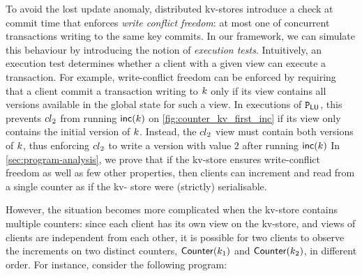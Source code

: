 To avoid the lost update anomaly, distributed kv-stores introduce a check at commit time that enforces 
\emph{write conflict freedom}: at most one of concurrent transactions writing to the same key commits. 
In our framework, we can simulate this behaviour by introducing the notion of \emph{execution tests}. 
Intuitively, an execution test determines whether a client with a given view can execute a transaction. 
For example, write-conflict freedom can be enforced by requiring that a client commit a transaction writing to $k$ 
only if its view contains all versions available in the global state for such a view. 
In executions of $\mathtt{P}_{\mathsf{LU}}$,
this prevents ${cl}_2$ from running $\mathsf{inc}(k)$ on \cref{fig:counter_kv_first_inc}
if its view only contains the initial version of $k$. 
Instead, the ${cl}_2$ view must contain both versions of $k$, 
thus enforcing ${cl}_2$ to write a version with value $2$ after running $\mathsf{inc}(k)$
In \cref{sec:program-analysis}, we prove that if the kv-store 
ensures write-conflict freedom as well as few other properties, then clients can increment 
and read from a single counter as if the kv- store were (strictly) serialisable.

However, the situation becomes more complicated when the kv-store contains multiple counters:  
since each client has its own view on the kv-store, and views of clients are independent from each other, it is possible for two 
clients to observe the increments on two distinct counters, $\mathsf{Counter}(k_1)$ and $\mathsf{Counter}(k_2)$, in different order. 
For instance, consider the following program:

